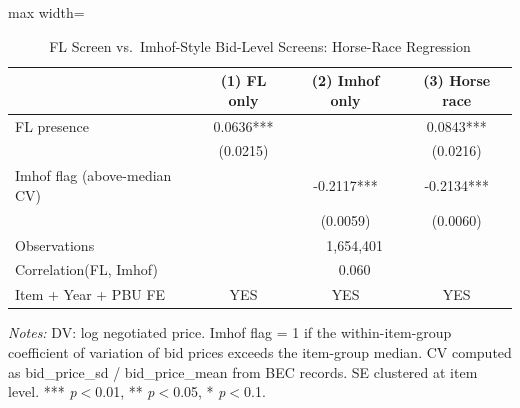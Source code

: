 \begin{table}[htbp]
\centering
\caption{FL Screen vs.\ Imhof-Style Bid-Level Screens: Horse-Race Regression}
\label{tab:screen_horserace}
\begin{adjustbox}{max width=\textwidth}
\begin{threeparttable}
\small
\begin{tabular}{lccc}
\toprule
 & (1) FL only & (2) Imhof only & (3) Horse race \\
\midrule
FL presence & 0.0636*** & & 0.0843*** \\
 & (0.0215) & & (0.0216) \\
Imhof flag (above-median CV) & & -0.2117*** & -0.2134*** \\
 & & (0.0059) & (0.0060) \\
\midrule
Observations & \multicolumn{3}{c}{1,654,401} \\
Correlation(FL, Imhof) & \multicolumn{3}{c}{0.060} \\
Item + Year + PBU FE & YES & YES & YES \\
\bottomrule
\end{tabular}
\begin{tablenotes}
\small
\item \textit{Notes:} DV: log negotiated price. Imhof flag = 1 if the within-item-group coefficient of variation of bid prices exceeds the item-group median. CV computed as bid\_price\_sd / bid\_price\_mean from BEC records. SE clustered at item level. *** \textit{p}$<$0.01, ** \textit{p}$<$0.05, * \textit{p}$<$0.1.
\end{tablenotes}
\end{threeparttable}
\end{adjustbox}
\end{table}
